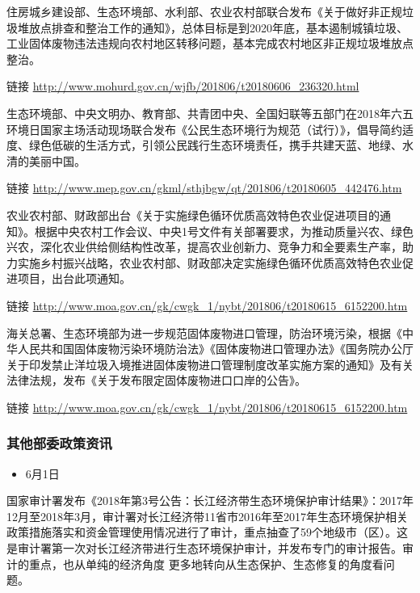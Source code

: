 \documentclass[
]{book}
\providecommand{\tightlist}{%
  \setlength{\itemsep}{0pt}\setlength{\parskip}{0pt}}
\begin{document}
住房城乡建设部、生态环境部、水利部、农业农村部联合发布《关于做好非正规垃圾堆放点排查和整治工作的通知》，总体目标是到2020年底，基本遏制城镇垃圾、工业固体废物违法违规向农村地区转移问题，基本完成农村地区非正规垃圾堆放点整治。

链接 \url{http://www.mohurd.gov.cn/wjfb/201806/t20180606_236320.html}

生态环境部、中央文明办、教育部、共青团中央、全国妇联等五部门在2018年六五环境日国家主场活动现场联合发布《公民生态环境行为规范（试行）》，倡导简约适度、绿色低碳的生活方式，引领公民践行生态环境责任，携手共建天蓝、地绿、水清的美丽中国。

链接 \url{http://www.mep.gov.cn/gkml/sthjbgw/qt/201806/t20180605_442476.htm}

农业农村部、财政部出台《关于实施绿色循环优质高效特色农业促进项目的通知》。根据中央农村工作会议、中央1号文件有关部署要求，为推动质量兴农、绿色兴农，深化农业供给侧结构性改革，提高农业创新力、竞争力和全要素生产率，助力实施乡村振兴战略，农业农村部、财政部决定实施绿色循环优质高效特色农业促进项目，出台此项通知。

链接 \url{http://www.moa.gov.cn/gk/cwgk_1/nybt/201806/t20180615_6152200.htm}

海关总署、生态环境部为进一步规范固体废物进口管理，防治环境污染，根据《中华人民共和国固体废物污染环境防治法》《固体废物进口管理办法》《国务院办公厅关于印发禁止洋垃圾入境推进固体废物进口管理制度改革实施方案的通知》及有关法律法规，发布《关于发布限定固体废物进口口岸的公告》。

链接 \url{http://www.moa.gov.cn/gk/cwgk_1/nybt/201806/t20180615_6152200.htm}

\hypertarget{ux5176ux4ed6ux90e8ux59d4ux653fux7b56ux8d44ux8baf-2}{%
\subsubsection*{其他部委政策资讯}\label{ux5176ux4ed6ux90e8ux59d4ux653fux7b56ux8d44ux8baf-2}}

\begin{itemize}
\tightlist
\item
  6月1日
\end{itemize}

国家审计署发布《2018年第3号公告：长江经济带生态环境保护审计结果》：2017年12月至2018年3月，审计署对长江经济带11省市2016年至2017年生态环境保护相关政策措施落实和资金管理使用情况进行了审计，重点抽查了59个地级市（区）。这是审计署第一次对长江经济带进行生态环境保护审计，并发布专门的审计报告。审计的重点，也从单纯的经济角度 更多地转向从生态保护、生态修复的角度看问题。
\end{document}
